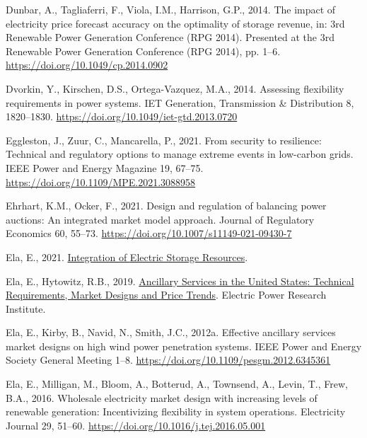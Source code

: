 \documentclass[12pt,a4paper,]{report}
\newlength{\cslhangindent}
\newenvironment{CSLReferences}[2] %
 {%
  \setlength{\parindent}{0pt}
  \ifodd #1 \everypar{\setlength{\hangindent}{\cslhangindent}}\ignorespaces\fi
  \ifnum #2 > 0
  \setlength{\parskip}{#2\baselineskip}
  \fi
 }%
 {}
\begin{document}
\begin{CSLReferences}{1}{0}
\leavevmode{}%
Dunbar, A., Tagliaferri, F., Viola, I.M., Harrison, G.P., 2014. The
impact of electricity price forecast accuracy on the optimality of
storage revenue, in: 3rd {Renewable Power Generation Conference} ({RPG}
2014). Presented at the 3rd {Renewable Power Generation Conference}
({RPG} 2014), pp. 1--6. \url{https://doi.org/10.1049/cp.2014.0902}

\leavevmode{}%
Dvorkin, Y., Kirschen, D.S., Ortega-Vazquez, M.A., 2014. Assessing
flexibility requirements in power systems. IET Generation, Transmission
\& Distribution 8, 1820--1830.
\url{https://doi.org/10.1049/iet-gtd.2013.0720}

\leavevmode{}%
Eggleston, J., Zuur, C., Mancarella, P., 2021. From security to
resilience: {Technical} and regulatory options to manage extreme events
in low-carbon grids. IEEE Power and Energy Magazine 19, 67--75.
\url{https://doi.org/10.1109/MPE.2021.3088958}

\leavevmode{}%
Ehrhart, K.M., Ocker, F., 2021. Design and regulation of balancing power
auctions: An integrated market model approach. Journal of Regulatory
Economics 60, 55--73. \url{https://doi.org/10.1007/s11149-021-09430-7}

\leavevmode{}%
Ela, E., 2021.
\href{https://www.energy.gov/sites/prod/files/2021/02/f82/Energy\%20Storage_Ela_EPRI_0.pdf}{Integration
of {Electric Storage Resources}}.

\leavevmode{}%
Ela, E., Hytowitz, R.B., 2019.
\href{https://www.epri.com/research/products/000000003002015670}{Ancillary
{Services} in the {United States}: {Technical Requirements}, {Market
Designs} and {Price Trends}}. {Electric Power Research Institute}.

\leavevmode{}%
Ela, E., Kirby, B., Navid, N., Smith, J.C., 2012a. Effective ancillary
services market designs on high wind power penetration systems. IEEE
Power and Energy Society General Meeting 1--8.
\url{https://doi.org/10.1109/pesgm.2012.6345361}

\leavevmode{}%
Ela, E., Milligan, M., Bloom, A., Botterud, A., Townsend, A., Levin, T.,
Frew, B.A., 2016. Wholesale electricity market design with increasing
levels of renewable generation: {Incentivizing} flexibility in system
operations. Electricity Journal 29, 51--60.
\url{https://doi.org/10.1016/j.tej.2016.05.001}


\end{CSLReferences}
\end{document}
